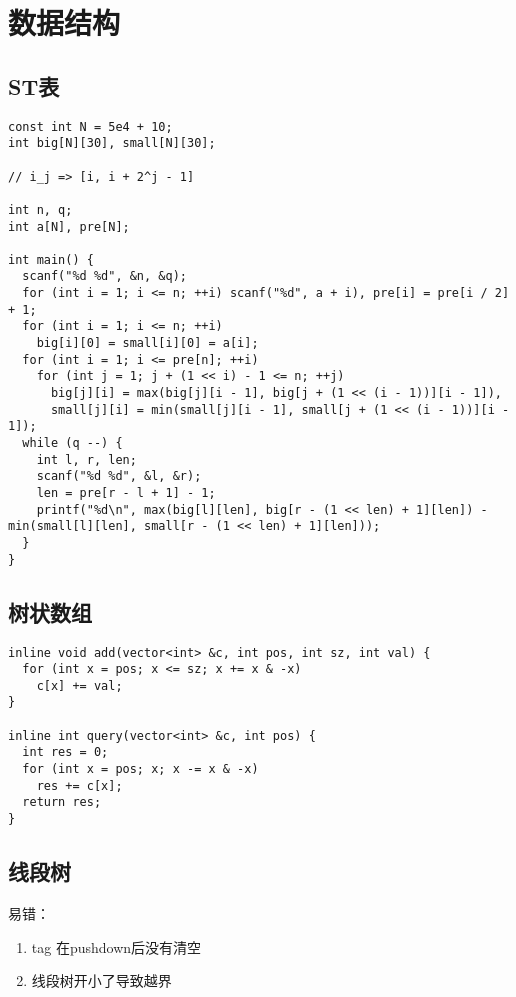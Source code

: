 \chapter{数据结构}

\section{ST表}

\begin{lstlisting}
const int N = 5e4 + 10;
int big[N][30], small[N][30];

// i_j => [i, i + 2^j - 1]

int n, q;
int a[N], pre[N];

int main() {
  scanf("%d %d", &n, &q);
  for (int i = 1; i <= n; ++i) scanf("%d", a + i), pre[i] = pre[i / 2] + 1;
  for (int i = 1; i <= n; ++i)
    big[i][0] = small[i][0] = a[i];
  for (int i = 1; i <= pre[n]; ++i)
    for (int j = 1; j + (1 << i) - 1 <= n; ++j)
      big[j][i] = max(big[j][i - 1], big[j + (1 << (i - 1))][i - 1]),
      small[j][i] = min(small[j][i - 1], small[j + (1 << (i - 1))][i - 1]);
  while (q --) {
    int l, r, len;
    scanf("%d %d", &l, &r);
    len = pre[r - l + 1] - 1;
    printf("%d\n", max(big[l][len], big[r - (1 << len) + 1][len]) - min(small[l][len], small[r - (1 << len) + 1][len]));
  }
}

\end{lstlisting}


\section{树状数组}

\begin{lstlisting}
inline void add(vector<int> &c, int pos, int sz, int val) {
  for (int x = pos; x <= sz; x += x & -x)
    c[x] += val;
}

inline int query(vector<int> &c, int pos) {
  int res = 0;
  for (int x = pos; x; x -= x & -x)
    res += c[x];
  return res;
}
\end{lstlisting}

\section{线段树}

易错：

\begin{enumerate}
  \item tag 在pushdown后没有清空
  \item 线段树开小了导致越界
\end{enumerate}

